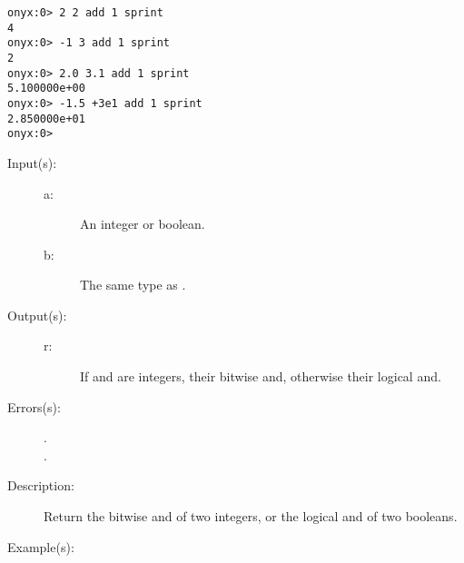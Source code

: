 \begin{description}
\begin{description}
\begin{verbatim}
onyx:0> 2 2 add 1 sprint
4
onyx:0> -1 3 add 1 sprint
2
onyx:0> 2.0 3.1 add 1 sprint
5.100000e+00
onyx:0> -1.5 +3e1 add 1 sprint
2.850000e+01
onyx:0>
		\end{verbatim}
	\end{description}
\label{systemdict:and}
\item[{\onyxop{a b}{and}{r}}: ]
	\begin{description}\item[]
	\item[Input(s): ]
		\begin{description}\item[]
		\item[a: ]
			An integer or boolean.
		\item[b: ]
			The same type as .
		\end{description}
	\item[Output(s): ]
		\begin{description}\item[]
		\item[r: ]
			If  and  are integers, their bitwise
			and, otherwise their logical and.
		\end{description}
	\item[Errors(s): ]
		\begin{description}\item[]
		\item[.]
		\item[.]
		\end{description}
	\item[Description: ]
		Return the bitwise and of two integers, or the logical and of
		two booleans.
	\item[Example(s): ]\begin{verbatim}


\end{verbatim}
\end{description}
\end{description}
